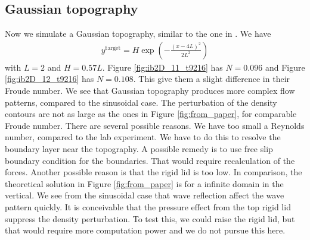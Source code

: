 \documentclass[11pt,letterpaper]{article}
\begin{document}
\subsection{Gaussian topography}
Now we simulate a Gaussian topography, similar to the one in \cite{EiffBonneton_00}. We have
\begin{align}
    y^\text{target} = H\exp\left( -\frac{(x-4L)^2}{2L^2} \right)
\end{align}
with $L = 2$ and $H = 0.57L$. Figure \ref{fig:ib2D_11_t9216} has $N=0.096$ and Figure \ref{fig:ib2D_12_t9216} has $N=0.108$. This give them a slight difference in their Froude number. We see that Gaussian topography produces more complex flow patterns, compared to the sinusoidal case. The perturbation of the density contours are not as large as the ones in Figure \ref{fig:from_paper}, for comparable Froude number. There are several possible reasons. We have too small a Reynolds number, compared to the lab experiment. We have to do this to resolve the boundary layer near the topography. A possible remedy is to use free slip boundary condition for the boundaries. That would require recalculation of the forces. Another possible reason is that the rigid lid is too low. In comparison, the theoretical solution in Figure \ref{fig:from_paper} is for a infinite domain in the vertical. We see from the sinusoidal case that wave reflection affect the wave pattern quickly. It is conceivable that the pressure effect from the top rigid lid suppress the density perturbation. To test this, we could raise the rigid lid, but that would require more computation power and we do not pursue this here.
\end{document}
